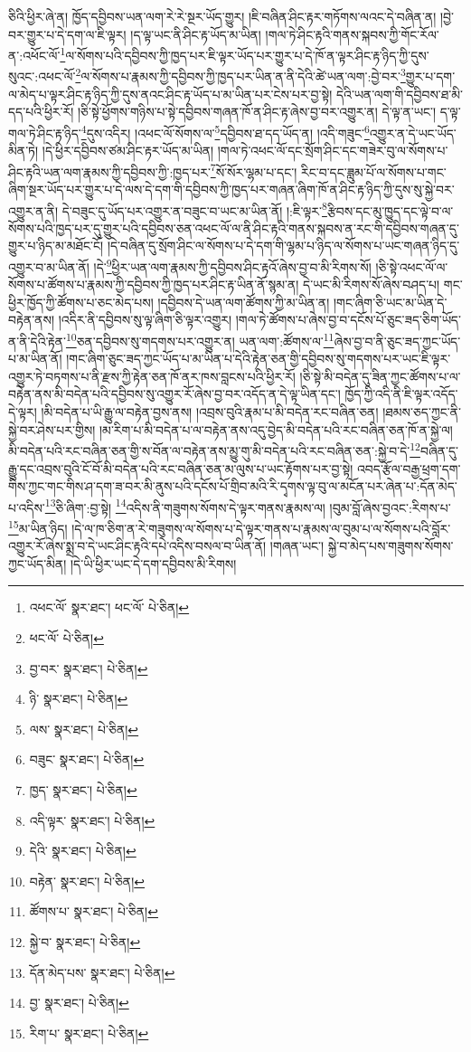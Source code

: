 ཅིའི་ཕྱིར་ཞེ་ན། ཁྱོད་དབྱིབས་ཡན་ལག་རེ་རེ་སྔར་ཡོད་གྱུར། །ཇི་བཞིན་ཤིང་རྟར་གཏོགས་ལའང་དེ་བཞིན་ན། །བྱེ་བར་གྱུར་པ་དེ་དག་ལ་ཇི་ལྟར། །ད་ལྟ་ཡང་ནི་ཤིང་རྟ་ཡོད་མ་ཡིན། །གལ་ཏེ་ཤིང་རྟའི་གནས་སྐབས་ཀྱི་གོང་རོལ་ན་:འཕོང་ལོ་\footnote{འཕང་ལོ་  སྣར་ཐང་། ཕང་ལོ་  པེ་ཅིན། }ལ་སོགས་པའི་དབྱིབས་ཀྱི་ཁྱད་པར་ཇི་ལྟར་ཡོད་པར་གྱུར་པ་དེ་ཁོ་ན་ལྟར་ཤིང་རྟ་ཉིད་ཀྱི་དུས་སུའང་:འཕང་ལོ་\footnote{ཕང་ལོ་  པེ་ཅིན། }ལ་སོགས་པ་རྣམས་ཀྱི་དབྱིབས་ཀྱི་ཁྱད་པར་ཡིན་ན་ནི་དེའི་ཚེ་ཡན་ལག་:བྱེ་བར་\footnote{བྱ་བར་  སྣར་ཐང་།  པེ་ཅིན། }གྱུར་པ་དག་ལ་མེད་པ་ལྟར་ཤིང་རྟ་ཉིད་ཀྱི་དུས་ནའང་ཤིང་རྟ་ཡོད་པ་མ་ཡིན་པར་ངེས་པར་བྱ་སྟེ། དེའི་ཡན་ལག་གི་དབྱིབས་ཐ་མི་དད་པའི་ཕྱིར་རོ། །ཅི་སྟེ་ཕྱོགས་གཉིས་པ་སྟེ་དབྱིབས་གཞན་ཁོ་ན་ཤིང་རྟ་ཞེས་བྱ་བར་འགྱུར་ན། དེ་ལྟ་ན་ཡང་། ད་ལྟ་གལ་ཏེ་ཤིང་རྟ་ཉིད་\footnote{ཉི་  སྣར་ཐང་།  པེ་ཅིན། }དུས་འདིར། །འཕང་ལོ་སོགས་ལ་\footnote{ལས་  སྣར་ཐང་།  པེ་ཅིན། }དབྱིབས་ཐ་དད་ཡོད་ན། །འདི་གཟུང་\footnote{བཟུང་  སྣར་ཐང་།  པེ་ཅིན། }འགྱུར་ན་དེ་ཡང་ཡོད་མིན་ཏེ། །དེ་ཕྱིར་དབྱིབས་ཙམ་ཤིང་རྟར་ཡོད་མ་ཡིན། །གལ་ཏེ་འཕང་ལོ་དང་སྲོག་ཤིང་དང་གཟེར་བུ་ལ་སོགས་པ་ཤིང་རྟའི་ཡན་ལག་རྣམས་ཀྱི་དབྱིབས་ཀྱི་:ཁྱད་པར་\footnote{ཁྱད་  སྣར་ཐང་།  པེ་ཅིན། }སོ་སོར་ལྷམ་པ་དང་། རིང་བ་དང་ཟླུམ་པོ་ལ་སོགས་པ་གང་ཞིག་སྔར་ཡོད་པར་གྱུར་པ་དེ་ལས་དེ་དག་གི་དབྱིབས་ཀྱི་ཁྱད་པར་གཞན་ཞིག་ཁོ་ན་ཤིང་རྟ་ཉིད་ཀྱི་དུས་སུ་སྐྱེ་བར་འགྱུར་ན་ནི། དེ་བཟུང་དུ་ཡོད་པར་འགྱུར་ན་བཟུང་བ་ཡང་མ་ཡིན་ནོ། །:ཇི་ལྟར་\footnote{འདི་ལྟར་  སྣར་ཐང་།  པེ་ཅིན། }རྩིབས་དང་མུ་ཁྱུད་དང་ལྟེ་བ་ལ་སོགས་པའི་ཁྱད་པར་དུ་གྱུར་པའི་དབྱིབས་ཅན་འཕང་ལོ་ལ་ནི་ཤིང་རྟའི་གནས་སྐབས་ན་རང་གི་དབྱིབས་གཞན་དུ་གྱུར་པ་ཉིད་མ་མཐོང་ངོ། །དེ་བཞིན་དུ་སྲོག་ཤིང་ལ་སོགས་པ་དེ་དག་གི་ལྷམ་པ་ཉིད་ལ་སོགས་པ་ཡང་གཞན་ཉིད་དུ་འགྱུར་བ་མ་ཡིན་ནོ། །དེ་\footnote{དེའི་  སྣར་ཐང་།  པེ་ཅིན། }ཕྱིར་ཡན་ལག་རྣམས་ཀྱི་དབྱིབས་ཤིང་རྟའོ་ཞེས་བྱ་བ་མི་རིགས་སོ། །ཅི་སྟེ་འཕང་ལོ་ལ་སོགས་པ་ཚོགས་པ་རྣམས་ཀྱི་དབྱིབས་ཀྱི་ཁྱད་པར་ཤིང་རྟ་ཡིན་ནོ་སྙམ་ན། དེ་ཡང་མི་རིགས་སོ་ཞེས་བཤད་པ། གང་ཕྱིར་ཁྱོད་ཀྱི་ཚོགས་པ་ཅང་མེད་པས། །དབྱིབས་དེ་ཡན་ལག་ཚོགས་ཀྱི་མ་ཡིན་ན། །གང་ཞིག་ཅི་ཡང་མ་ཡིན་དེ་བརྟེན་ནས། །འདིར་ནི་དབྱིབས་སུ་ལྟ་ཞིག་ཅི་ལྟར་འགྱུར། །གལ་ཏེ་ཚོགས་པ་ཞེས་བྱ་བ་དངོས་པོ་ཅུང་ཟད་ཅིག་ཡོད་ན་ནི་དེའི་རྟེན་\footnote{བརྟེན་  སྣར་ཐང་།  པེ་ཅིན། }ཅན་དབྱིབས་སུ་གདགས་པར་འགྱུར་ན། ཡན་ལག་:ཚོགས་ལ་\footnote{ཚོགས་པ་  སྣར་ཐང་།  པེ་ཅིན། }ཞེས་བྱ་བ་ནི་ཅུང་ཟད་ཀྱང་ཡོད་པ་མ་ཡིན་ནོ། །གང་ཞིག་ཅུང་ཟད་ཀྱང་ཡོད་པ་མ་ཡིན་པ་དེའི་རྟེན་ཅན་གྱི་དབྱིབས་སུ་གདགས་པར་ཡང་ཇི་ལྟར་འགྱུར་ཏེ་བཏགས་པ་ནི་རྫས་ཀྱི་རྟེན་ཅན་ཁོ་ནར་ཁས་བླངས་པའི་ཕྱིར་རོ། །ཅི་སྟེ་མི་བདེན་དུ་ཟིན་ཀྱང་ཚོགས་པ་ལ་བརྟེན་ནས་མི་བདེན་པའི་དབྱིབས་སུ་འགྱུར་རོ་ཞེས་བྱ་བར་འདོད་ན་དེ་ལྟ་ཡིན་དང་། ཁྱོད་ཀྱི་འདི་ནི་ཇི་ལྟར་འདོད་དེ་ལྟར། །མི་བདེན་པ་ཡི་རྒྱུ་ལ་བརྟེན་བྱས་ནས། །འབྲས་བུའི་རྣམ་པ་མི་བདེན་རང་བཞིན་ཅན། །ཐམས་ཅད་ཀྱང་ནི་སྐྱེ་བར་ཤེས་པར་གྱིས། །མ་རིག་པ་མི་བདེན་པ་ལ་བརྟེན་ནས་འདུ་བྱེད་མི་བདེན་པའི་རང་བཞིན་ཅན་ཁོ་ན་སྐྱེ་ལ། མི་བདེན་པའི་རང་བཞིན་ཅན་གྱི་ས་བོན་ལ་བརྟེན་ནས་མྱུ་གུ་མི་བདེན་པའི་རང་བཞིན་ཅན་:སྐྱེ་བ་དེ་\footnote{སྐྱེ་བ་  སྣར་ཐང་།  པེ་ཅིན། }བཞིན་དུ་རྒྱུ་དང་འབྲས་བུའི་ངོ་བོ་མི་བདེན་པའི་རང་བཞིན་ཅན་མ་ལུས་པ་ཡང་རྟོགས་པར་བྱ་སྟེ། འབད་རྩོལ་བརྒྱ་ཕྲག་དག་གིས་ཀྱང་གང་གིས་ཤ་དག་ཟ་བར་མི་ནུས་པའི་དངོས་པོ་གྲིབ་མའི་རི་དྭགས་ལྟ་བུ་ལ་མངོན་པར་ཞེན་པ་:དོན་མེད་པ་འདིས་\footnote{དོན་མེད་པས་  སྣར་ཐང་།  པེ་ཅིན། }ཅི་ཞིག་:བྱ་སྟེ། \footnote{བྱ་  སྣར་ཐང་།  པེ་ཅིན། }འདིས་ནི་གཟུགས་སོགས་དེ་ལྟར་གནས་རྣམས་ལ། །བུམ་བློ་ཞེས་བྱའང་:རིགས་པ་\footnote{རིག་པ་  སྣར་ཐང་།  པེ་ཅིན། }མ་ཡིན་ཉིད། །དེ་ལ་ཁ་ཅིག་ན་རེ་གཟུགས་ལ་སོགས་པ་དེ་ལྟར་གནས་པ་རྣམས་ལ་བུམ་པ་ལ་སོགས་པའི་བློར་འགྱུར་རོ་ཞེས་སྨྲ་བ་དེ་ཡང་ཤིང་རྟའི་དཔེ་འདིས་བསལ་བ་ཡིན་ནོ། །གཞན་ཡང་། སྐྱེ་བ་མེད་པས་གཟུགས་སོགས་ཀྱང་ཡོད་མིན། །དེ་ཡི་ཕྱིར་ཡང་དེ་དག་དབྱིབས་མི་རིགས། 